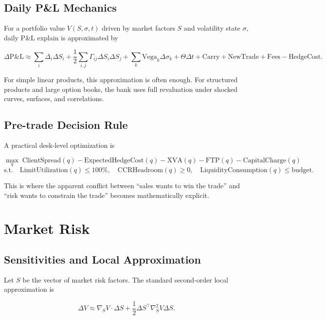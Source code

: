 \documentclass{apex_mdd}
\begin{document}
\subsection{Daily P\&L Mechanics}

For a portfolio value $V(S,\sigma,t)$ driven by market factors $S$ and volatility state $\sigma$, daily P\&L explain is approximated by
\begin{formulabox}
\[
  \Delta \mathrm{P\&L}
  \approx
  \sum_i \Delta_i \Delta S_i
  + \frac{1}{2}\sum_{i,j}\Gamma_{ij}\Delta S_i \Delta S_j
  + \sum_k \mathrm{Vega}_k \Delta \sigma_k
  + \Theta \Delta t
  + \mathrm{Carry}
  + \mathrm{NewTrade}
  + \mathrm{Fees}
  - \mathrm{HedgeCost}.
\]
\end{formulabox}

For simple linear products, this approximation is often enough. For structured products and large option books, the bank uses full revaluation under shocked curves, surfaces, and correlations.

\subsection{Pre-trade Decision Rule}

A practical desk-level optimization is
\begin{formulabox}
\[
  \max_{q}
  \;
  \mathrm{ClientSpread}(q)
  - \mathrm{ExpectedHedgeCost}(q)
  - \mathrm{XVA}(q)
  - \mathrm{FTP}(q)
  - \mathrm{CapitalCharge}(q)
\]
\[
  \text{s.t.}
  \quad
  \mathrm{LimitUtilization}(q) \leq 100\%,
  \quad
  \mathrm{CCRHeadroom}(q) \geq 0,
  \quad
  \mathrm{LiquidityConsumption}(q) \leq \text{budget.}
\]
\end{formulabox}

This is where the apparent conflict between ``sales wants to win the trade'' and ``risk wants to constrain the trade'' becomes mathematically explicit.

\section{Market Risk}

\subsection{Sensitivities and Local Approximation}

Let $S$ be the vector of market risk factors. The standard second-order local approximation is
\begin{formulabox}
\[
  \Delta V
  \approx
  \nabla_S V \cdot \Delta S
  + \frac{1}{2}\Delta S^\top \nabla_S^2 V \Delta S.
\]
\end{formulabox}
\end{document}
